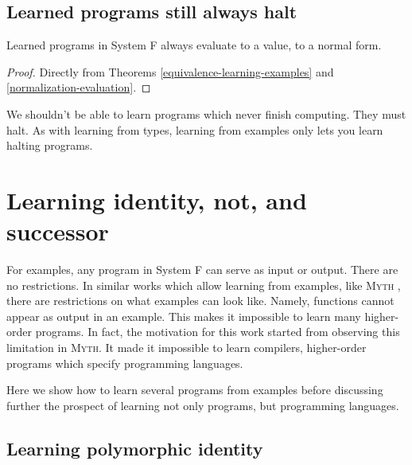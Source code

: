 \subsection{Learned programs still always halt}

\begin{corollary}
Learned programs in System F always evaluate to a value, to a normal form.
\label{normalization-learning}
\end{corollary}
\begin{proof}
Directly from Theorems \ref{equivalence-learning-examples} and \ref{normalization-evaluation}. 
\end{proof}
\vspace{-.8em}

We shouldn't be able to learn programs which never finish computing. They must halt. As with learning from types, learning from examples only lets you learn halting programs.

\section{Learning identity, not, and successor}

For examples, any program in System F can serve as input or output. There are no restrictions. In similar works which allow learning from examples, like \textsc{Myth} \cite{osera2015program}, there are restrictions on what examples can look like. Namely, functions cannot appear as output in an example. This makes it impossible to learn many higher-order programs. In fact, the motivation for this work started from observing this limitation in \textsc{Myth}. It made it impossible to learn compilers, higher-order programs which specify programming languages. 

Here we show how to learn several programs from examples before discussing further the prospect of learning not only programs, but programming languages.

\subsection{Learning polymorphic identity}


